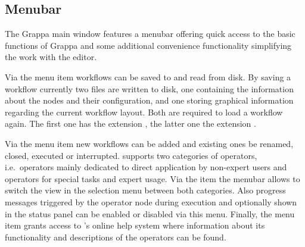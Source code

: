 \subsection{Menubar} 
The Grappa main window features a menubar offering quick
access to the basic functions of Grappa and some additional convenience functionality simplifying
the work with the editor. 

Via the menu item  workflows can be saved to and read from
disk. By saving a workflow currently two files are written to disk, one containing the information
about the nodes and their configuration, and one storing graphical information
regarding the current workflow layout. Both are required to load a workflow
again. The first one has the extension , the latter one the
extension .

Via the menu item  new workflows can be added and existing ones be renamed, 
closed, executed or interrupted.  
\alida supports two categories of
operators, i.e.~operators mainly dedicated to direct application by non-expert users
and operators for special tasks and expert usage. Via the item  the menubar allows
to switch the view in the selection menu between both categories. Also progress messages triggered by the
operator node during execution and optionally shown in the status panel can be enabled or
disabled via this menu. Finally, the menu item  grants access to \alida's online help system
where information about its functionality and descriptions of the operators can be found.

